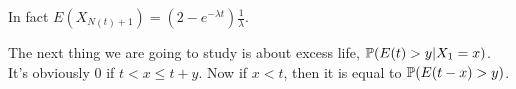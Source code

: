 \documentclass[a4paper]{article}
\begin{document}
In fact $E(X_{N(t)+1} ) = (2-e^{-\lambda t}) \frac{1}{\lambda}$.

The next thing we are going to study is about excess life, $\P(E(t)>y|X_1=x)$. It's obviously 0 if $t<x\leq t+y$. Now if $x<t$, then it is equal to $\P(E(t-x) > y)$.

\end{document}

